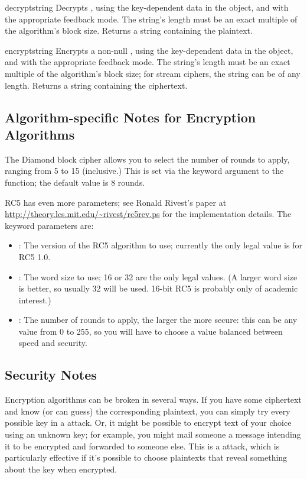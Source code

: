 \documentclass{howto}
\begin{document}
\begin{funcdesc}{decrypt}{string}
Decrypts , using the key-dependent data in the object, and
with the appropriate feedback mode.  The string's length must be an exact
multiple of the algorithm's block size.  Returns a string containing
the plaintext.
\end{funcdesc}

\begin{funcdesc}{encrypt}{string}
Encrypts a non-null , using the key-dependent data in the
object, and with the appropriate feedback mode.  The string's length
must be an exact multiple of the algorithm's block size; for stream
ciphers, the string can be of any length.  Returns a string containing
the ciphertext.
\end{funcdesc}

\subsection{Algorithm-specific Notes for Encryption Algorithms}

The Diamond block cipher allows you to select the number of rounds to
apply, ranging from 5 to 15 (inclusive.)  This is set via the
 keyword argument to the  function; the default
value is 8 rounds.

RC5 has even more parameters; see Ronald Rivest's paper at \url{http://theory.lcs.mit.edu/~rivest/rc5rev.ps}
for the implementation details.  The keyword parameters are:

\begin{itemize}
\item {}:
The version
of the RC5 algorithm to use; currently the only legal value is
 for RC5 1.0.  
\item {}:
The word size to use;
16 or 32 are the only legal values.  (A larger word size is better, so
usually 32 will be used.  16-bit RC5 is probably only of academic
interest.)  
\item {}:
The number of rounds to apply, the larger the more secure: this
can be any value from 0 to 255, so you will have to choose a value
balanced between speed and security. 
\end{itemize}

\subsection{Security Notes}
Encryption algorithms can be broken in several ways.  If you have some
ciphertext and know (or can guess) the corresponding plaintext, you can
simply try every possible key in a  attack.  Or, it
might be possible to encrypt text of your choice using an unknown key;
for example, you might mail someone a message intending it to be
encrypted and forwarded to someone else.  This is a
 attack, which is particularly effective if it's
possible to choose plaintexts that reveal something about the key when
encrypted.
\end{document}
